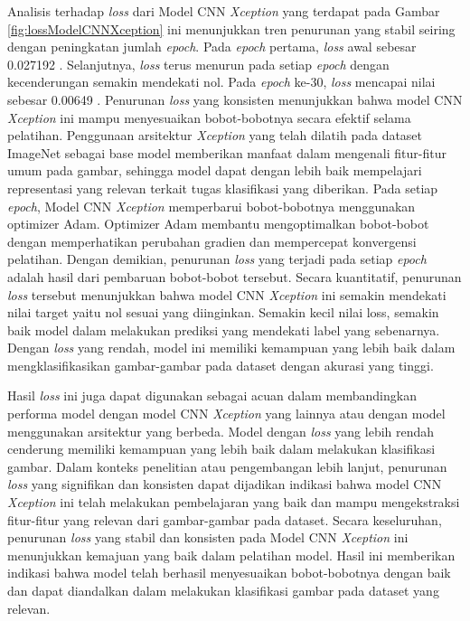 Analisis terhadap \textit{loss} dari Model CNN \textit{Xception} yang terdapat pada Gambar \ref{fig:lossModelCNNXception} ini menunjukkan tren penurunan yang stabil seiring dengan peningkatan jumlah \textit{epoch}. Pada \textit{epoch} pertama, \textit{loss} awal sebesar 0.027192 . Selanjutnya, \textit{loss} terus menurun pada setiap \textit{epoch} dengan kecenderungan semakin mendekati nol. Pada \textit{epoch} ke-30, \textit{loss} mencapai nilai sebesar 0.00649 . Penurunan \textit{loss} yang konsisten menunjukkan bahwa model CNN \textit{Xception} ini mampu menyesuaikan bobot-bobotnya secara efektif selama pelatihan. Penggunaan arsitektur \textit{Xception} yang telah dilatih pada dataset ImageNet sebagai base model memberikan manfaat dalam mengenali fitur-fitur umum pada gambar, sehingga model dapat dengan lebih baik mempelajari representasi yang relevan terkait tugas klasifikasi yang diberikan. Pada setiap \textit{epoch}, Model CNN \textit{Xception} memperbarui bobot-bobotnya menggunakan optimizer Adam. Optimizer Adam membantu mengoptimalkan bobot-bobot dengan memperhatikan perubahan gradien dan mempercepat konvergensi pelatihan. Dengan demikian, penurunan \textit{loss} yang terjadi pada setiap \textit{epoch} adalah hasil dari pembaruan bobot-bobot tersebut. Secara kuantitatif, penurunan \textit{loss} tersebut menunjukkan bahwa model CNN \textit{Xception} ini semakin mendekati nilai target yaitu nol sesuai yang diinginkan. Semakin kecil nilai loss, semakin baik model dalam melakukan prediksi yang mendekati label yang sebenarnya. Dengan \textit{loss} yang rendah, model ini memiliki kemampuan yang lebih baik dalam mengklasifikasikan gambar-gambar pada dataset dengan akurasi yang tinggi.

Hasil \textit{loss} ini juga dapat digunakan sebagai acuan dalam membandingkan performa model dengan model CNN \textit{Xception} yang lainnya atau dengan model menggunakan arsitektur yang berbeda. Model dengan \textit{loss} yang lebih rendah cenderung memiliki kemampuan yang lebih baik dalam melakukan klasifikasi gambar. Dalam konteks penelitian atau pengembangan lebih lanjut, penurunan \textit{loss} yang signifikan dan konsisten dapat dijadikan indikasi bahwa model CNN \textit{Xception} ini telah melakukan pembelajaran yang baik dan mampu mengekstraksi fitur-fitur yang relevan dari gambar-gambar pada dataset. Secara keseluruhan, penurunan \textit{loss} yang stabil dan konsisten pada Model CNN \textit{Xception} ini menunjukkan kemajuan yang baik dalam pelatihan model. Hasil ini memberikan indikasi bahwa model telah berhasil menyesuaikan bobot-bobotnya dengan baik dan dapat diandalkan dalam melakukan klasifikasi gambar pada dataset yang relevan.

